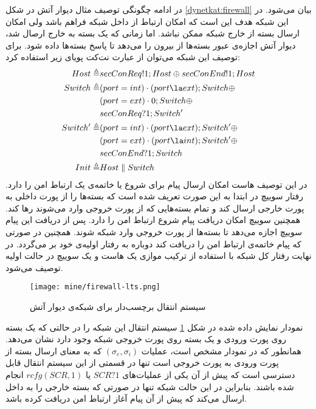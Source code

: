در ادامه چگونگی توصیف مثال دیوار آتش در شکل
\ref{dynetkat:firewall}
بیان می‌شود.
در این شبکه هدف این است که امکان ارتباط از داخل شبکه فراهم باشد ولی امکان ارسال بسته از خارج شبکه ممکن نباشد.
اما زمانی که یک بسته به خارج ارصال شد، دیوار آتش اجازه‌ی عبور بسته‌ها از بیرون را می‌دهد تا پاسخ بسته‌ها داده شود.
برای توصیف این شبکه می‌توان از عبارت نت‌کت پویای زیر استفاده کرد:
\begin{align*}
    Host  \triangleq   & secConReq!1;Host \oplus secConEnd!1;Host        \\
    Switch \triangleq  & (port = int) \cdot (port \la ext);Switch \oplus \\
                       & (port = ext)\cdot 0 ; Switch \oplus             \\
                       & secConReq?1;Switch'                             \\
    Switch' \triangleq & (port =int) \cdot (port \la ext);Switch' \oplus \\
                       & (port=ext)\cdot(port\la int);Switch' \oplus     \\
                       & secConEnd?1;Switch                              \\
    Init \triangleq    & Host \parallel Switch
\end{align*}
در این توصیف هاست امکان ارسال پیام برای شروع یا خاتمه‌ی یک ارتباط امن را دارد.
رفتار سوییچ در ابتدا به این صورت تعریف شده است که بسته‌ها را از پورت داخلی به پورت خارجی ارسال کند و تمام بسته‌هایی که از پورت خروجی وارد می‌شوند رها کند.
همچنین سوییچ امکان دریافت پیام شروع ارتباط امن را دارد.
پس از دریافت این پیام سوییچ اجازه می‌دهد تا بسته‌ها از پورت خروجی وارد شبکه شوند.
همچنین در صورتی که پیام خاتمه‌ی ارتباط امن را دریافت کند دوباره به رفتار اولیه‌ی خود بر می‌گردد.
در نهایت رفتار کل شبکه با استفاده از ترکیب موازی یک هاست و یک سوییچ در حالت اولیه توصیف می‌شود.
\begin{figure}[ht]
    \centerline{\texttt{[image: mine/firewall-lts.png]}}
    \caption{سیستم انتقال برچسب‌دار برای شبکه‌ی دیوار آتش}
    \label{firewall:lts}
\end{figure}
نمودار نمایش داده شده در شکل
\ref{firewall:lts}
سیستم انتقال این شبکه‌ را در حالتی که یک بسته روی پورت ورودی و یک بسته روی پورت خروجی شبکه وجود دارد نشان می‌دهد.
همانطور که در نمودار مشخص است، عملیات 
$(\sigma_e,\sigma_i)$
که به معنای ارسال بسته از پورت ورودی به پورت خروجی است تنها در قسمتی از این سیستم انتقال قابل دسترسی است که پیش از آن یکی از عملیات‌های 
$SCR?1$
یا
$rcfg(SCR,1)$
انجام شده باشند.
بنابراین در این حالت شبکه تنها در صورتی که بسته خارجی را به داخل ارسال می‌کند که پیش از آن پیام آغاز ارتباط امن دریافت کرده‌ باشد.

